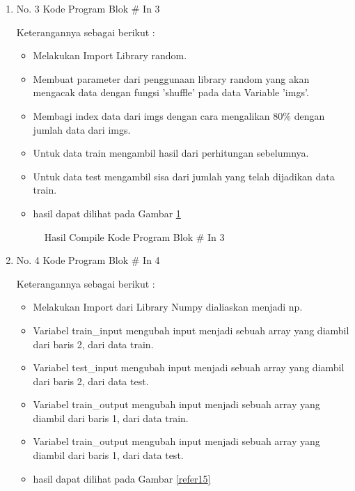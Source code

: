 \begin{enumerate}
\item No. 3 Kode Program Blok \# In 3
\par 
Keterangannya sebagai berikut :
\begin{itemize}
\item Melakukan Import Library random.
\item Membuat parameter dari penggunaan library random yang akan mengacak data dengan fungsi 'shuffle' pada data Variable 'imgs'.
\item Membagi index data dari imgs dengan cara mengalikan 80\% dengan jumlah data dari imgs.
\item Untuk data train mengambil hasil dari perhitungan sebelumnya.
\item Untuk data test mengambil sisa dari jumlah yang telah dijadikan data train.
\item hasil dapat dilihat pada Gambar \ref{refer14}
\end{itemize}

\begin{figure}[!htbp]
      \caption{Hasil Compile Kode Program Blok \# In 3}
      \label{refer14}
\end{figure}

\item No. 4 Kode Program Blok \# In 4
\par 
Keterangannya sebagai berikut :
\begin{itemize}
\item Melakukan Import dari Library Numpy dialiaskan menjadi np.
\item Variabel train\_input mengubah input menjadi sebuah array yang diambil dari baris 2, dari data train.
\item Variabel test\_input mengubah input menjadi sebuah array yang diambil dari baris 2, dari data test.
\item Variabel train\_output mengubah input menjadi sebuah array yang diambil dari baris 1, dari data train.
\item Variabel train\_output mengubah input menjadi sebuah array yang diambil dari baris 1, dari data test.
\item hasil dapat dilihat pada Gambar \ref{refer15}
\end{itemize}


\end{enumerate}
